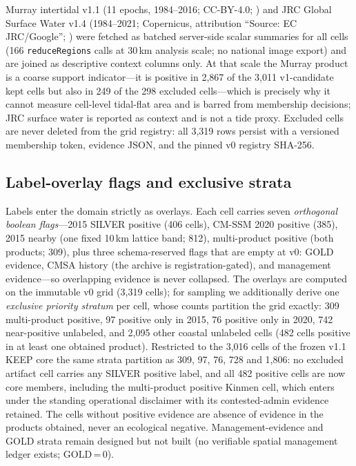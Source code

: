 Murray intertidal v1.1 (11 epochs, 1984--2016; CC-BY-4.0;
\citealp{murray2019tidalflats}) and JRC
Global Surface Water v1.4 (1984--2021; Copernicus, attribution
``Source: EC JRC/Google''; \citealp{pekel2016gsw}) were fetched as batched server-side scalar
summaries for all cells (166 \texttt{reduceRegions} calls at 30\,km
analysis scale; no national image export) and are joined as descriptive
context columns only. At that scale the Murray product is a coarse
support indicator---it is positive in 2{,}867 of the 3{,}011 v1-candidate kept cells
but also in 249 of the 298 excluded cells---which is precisely why it
cannot measure cell-level tidal-flat area and is barred from membership
decisions; JRC surface water is reported as context and is not a tide
proxy. Excluded cells are never deleted from the grid registry: all
3{,}319 rows persist with a versioned membership token, evidence JSON,
and the pinned v0 registry SHA-256.

\subsection{Label-overlay flags and exclusive strata}
Labels enter the domain strictly as overlays. Each cell carries seven
\emph{orthogonal boolean flags}---2015 SILVER positive (406 cells),
CM-SSM 2020 positive (385), 2015 nearby (one fixed 10\,km lattice band;
812), multi-product positive (both products; 309), plus three
schema-reserved flags that are empty at v0: GOLD evidence, CMSA history
(the archive is registration-gated), and management evidence---so
overlapping evidence is never collapsed. The overlays are computed on
the immutable v0 grid (3{,}319 cells); for sampling we additionally
derive one \emph{exclusive priority stratum} per cell, whose counts
partition the grid exactly: 309 multi-product positive, 97 positive
only in 2015, 76 positive only in 2020, 742 near-positive unlabeled,
and 2{,}095 other coastal unlabeled cells (482 cells positive in at
least one obtained product). Restricted to the 3{,}016 cells of the
frozen v1.1 KEEP core the same strata partition as 309, 97, 76, 728 and
1{,}806: no excluded artifact cell carries any SILVER positive label,
and all 482 positive cells are now core members, including the
multi-product positive Kinmen cell, which enters under the standing
operational disclaimer with its contested-admin evidence retained. The cells without positive evidence are absence of
evidence in the products obtained, never an ecological negative.
Management-evidence and GOLD strata remain designed but not built (no
verifiable spatial management ledger exists; GOLD\,=\,0).

